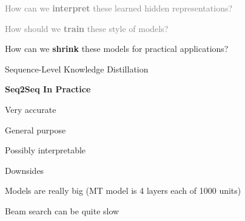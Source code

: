 \documentclass{beamer}
\let\tempone\itemize
\let\temptwo\enditemize
\renewenvironment{itemize}{\tempone\addtolength{\itemsep}{0.5\baselineskip}}{\temptwo}
\newcommand{\air}{\vspace{0.25cm}}
\newcommand{\Cite}[1]{{\footnotesize \citep{#1}}}
\begin{document}



\begin{frame}
  \centerline{}
  \air 
  \air

  \begin{itemize}
  \item \textcolor{gray}{How can we \textbf{interpret} these learned hidden representations? \Cite{Strobelt2016}}
    \air 
  \item  \textcolor{gray}{ How should we \textbf{train} these style of models? \Cite{Wiseman2016a}}
    \air 
  \item How can we \textbf{shrink} these models for practical applications?

    \air 
    \begin{center}
      \alert{Sequence-Level Knowledge Distillation }

      \Cite{Kim2016a} 
    \end{center}

  \end{itemize}
\end{frame}

\begin{frame}
  \centerline{\textbf{Seq2Seq In Practice}}
  \air

  \centerline{}


  \begin{itemize}
  \item Very accurate
  \item General purpose
  \item Possibly interpretable
  \end{itemize}

  \centerline{\alert{Downsides}}

  \begin{itemize}
  \item Models are really big (MT model is 4 layers each of 1000 units)
  \item Beam search can be quite slow
  \end{itemize}
\end{frame}
\end{document}
